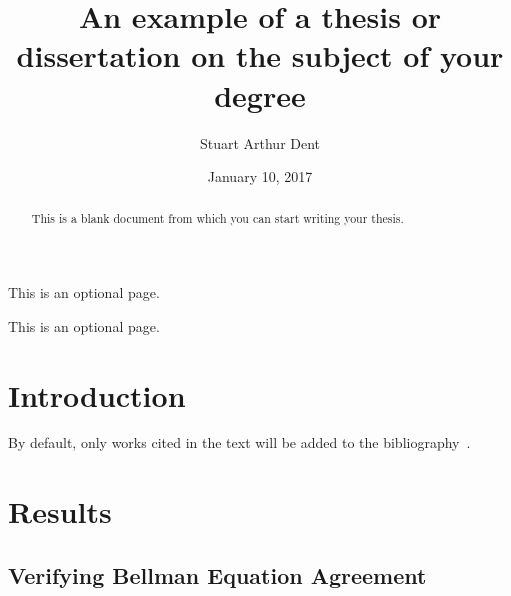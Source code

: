 \documentclass{sfuthesis}
\title{An example of a thesis or dissertation on the subject of your degree}
\author{Stuart Arthur Dent}
\date{January 10, 2017}
\begin{document}
\frontmatter
\maketitle{}
\makecommittee{}

\begin{abstract}
	This is a blank document from which you can start writing your thesis.
\end{abstract}


\begin{dedication}
	This is an optional page.
\end{dedication}


\begin{acknowledgements}
	This is an optional page.
\end{acknowledgements}

%
\tableofcontents%
\clearpage

%
\listoftables%
\clearpage

%
\listoffigures%
\clearpage





%
%

\mainmatter%

\chapter{Introduction}

By default, only works cited in the text will be added to the bibliography~\cite{latexcompanion}.

\chapter{Results}

\section{Verifying Bellman Equation Agreement}
\end{document}
